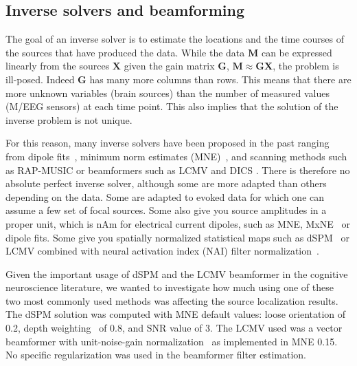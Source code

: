 \subsection{Inverse solvers and beamforming}

The goal of an inverse solver is to estimate the locations and the time courses of the sources that have produced the data. While the data $\mathbf{M}$ can be expressed linearly from the sources $\mathbf{X}$ given the gain matrix $\mathbf{G}$, $\mathbf{M} \approx \mathbf{GX}$, the problem is ill-posed. Indeed $\mathbf{G}$ has many more columns than rows. This means that there are more unknown variables (brain sources) than the number of measured values (M/EEG sensors) at each time point. This also implies that the solution of the inverse problem is not unique.

For this reason, many inverse solvers have been proposed in the past ranging from dipole fits~\citep{scherg-etal:85,mosher-lewis-etal92}, minimum norm estimates (MNE)~\citep{Hamalainen:1984}, and scanning methods such as RAP-MUSIC or beamformers such as LCMV and DICS \citep{Van_Veen:1997,gross-etal:2001,Sekihara:2005}. There is therefore no absolute perfect inverse solver, although some are more adapted than others depending on the data. Some are adapted to evoked data for which one can assume a few set of focal sources. Some also give you source amplitudes in a proper unit, which is nAm for electrical current dipoles, such as MNE, MxNE~\cite{gramfort-etal:2013} or dipole fits. Some give you spatially normalized statistical maps such as dSPM~\citep{dale2000dspm} or LCMV combined with neural activation index (NAI) filter normalization~\citep{Van_Veen:1997}.

Given the important usage of dSPM and the LCMV beamformer in the cognitive neuroscience literature, we wanted to investigate how much using one of these two most commonly used methods was affecting the source localization results. The dSPM solution was computed with MNE default values: loose orientation of 0.2, depth weighting~\citep{lin2006assessing} of 0.8, and SNR value of 3. The LCMV used was a vector beamformer with unit-noise-gain normalization~\citep{Sekihara:2005} as implemented in MNE 0.15. No specific regularization was used in the beamformer filter estimation.

